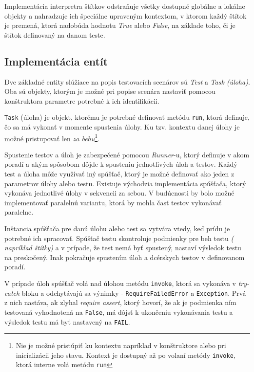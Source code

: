 \documentclass[
  digital, %
  twoside, %
  table,   %
  lof,     %
  lot,     %
]{fithesis3}
\begin{document}
Implementácia interpretra štítkov odstraňuje všetky dostupné globálne a lokálne objekty a nahradzuje ich špeciálne upraveným kontextom, v ktorom každý štítok je premená, ktorá nadobúda hodnotu \emph{True} alebo \emph{False}, na základe toho, či je štítok definovaný na danom teste. 

\subsection{Implementácia entít}

Dve základné entity slúžiace na popis testovacích scenárov sú \emph{Test} a \emph{Task (úloha)}. Oba sú objekty, ktorým je možné pri popise scenára nastaviť pomocou konštruktora parametre potrebné k ich identifikácii. 

\texttt{Task} (úloha) je objekt, ktorému je potrebné definovať metódu \texttt{run}, ktorá definuje, čo sa má vykonať v momente spustenia úlohy. Ku tzv. kontextu danej úlohy je možné pristupovať len \emph{za behu}\footnote{Nie je možné pristúpiť ku kontextu napríklad v konštruktore alebo pri inicializácii jeho stavu. Kontext je dostupný až po volaní metódy \texttt{invoke}, ktorá interne volá metódu \texttt{run}}.

Spustenie testov a úloh je zabezpečené pomocou \emph{Runner}-u, ktorý definuje v akom poradí a akým spôsobom dôjde k spusteniu jednotlivých úloh a testov. Každý test a úloha môže využívať iný spúšťač, ktorý je možné definovať ako jeden z parametrov úlohy alebo testu. Existuje východzia implementácia spúšťača, ktorý vykonáva jednotlivé úlohy v sekvencii za sebou. V budúcnosti by bolo možné implementovať paralelnú variantu, ktorá by mohla časť testov vykonávať paralelne.

Inštancia spúšťača pre danú úlohu alebo test sa vytvára vtedy, keď prídu je potrebné ich spracovať. Spúšťač testu skontroluje podmienky pre beh testu \emph{( napríklad štítky)} a v prípade, že test nemá byť spustený, nastaví výsledok testu na preskočený. Inak pokračuje spustením úloh a dcérskych testov v definovanom poradí.

V prípade úloh spúšťač volá nad úlohou metódu \texttt{invoke}, ktorá sa vykonáva v \emph{try-catch} bloku a odchytávajú sa výnimky - \texttt{RequireFailedError} a \texttt{Exception}. Prvá z nich nastáva, ak zlyhal \emph{require assert}, ktorý hovorí, že ak je podmienka ním testovaná vyhodnotená na \texttt{False}, má dôjsť k ukončeniu vykonávania testu a výsledok testu má byť nastavený na \texttt{FAIL}.
\end{document}
